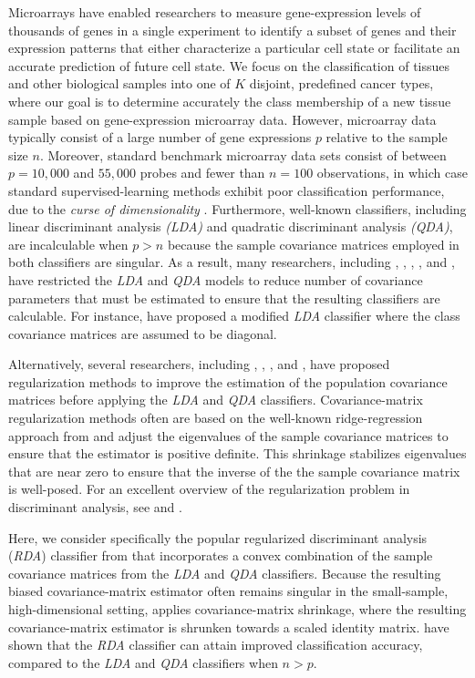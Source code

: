 \documentclass[11pt]{article}
\begin{document}
Microarrays have enabled researchers to measure gene-expression levels of thousands of genes in a single experiment to identify a subset of genes and their expression patterns that either characterize a particular cell state or facilitate an accurate prediction of future cell state.  We focus on the classification of tissues and other biological samples into one of $K$ disjoint, predefined cancer types, where our goal is to determine accurately the class membership of a new tissue sample based on gene-expression microarray data. However, microarray data typically consist of a large number of gene expressions $p$ relative to the sample size $n$. Moreover, standard benchmark microarray data sets consist of between $p = 10,000$ and $55,000$ probes and fewer than $n = 100$ observations, in which case standard supervised-learning methods exhibit poor classification performance, due to the \emph{curse of dimensionality} \citep{Bellman:1961tn}. Furthermore, well-known classifiers, including linear discriminant analysis \emph{(LDA)} and quadratic discriminant analysis \emph{(QDA)}, are incalculable when $p > n$ because the sample covariance matrices employed in both classifiers are singular. As a result, many researchers, including \cite*{Merchante:2012vk}, \cite{Witten:2011kc}, \cite*{Pang:2009ik}, \cite*{Huang:2010ju}, and \cite*{Clemmensen:2011kr}, have restricted the \emph{LDA} and \emph{QDA} models to reduce number of covariance parameters that must be estimated to ensure that the resulting classifiers are calculable.  For instance, \cite{Dudoit:2002ev} have proposed a modified \emph{LDA} classifier where the class covariance matrices are assumed to be diagonal.

Alternatively, several researchers, including \cite*{Zhang:2010va}, \cite*{Guo:2007te}, \cite{Srivastava:2007ud}, and \cite{Mkhadri:1995jp}, have proposed regularization methods to improve the estimation of the population covariance matrices before applying the \emph{LDA} and \emph{QDA} classifiers. Covariance-matrix regularization methods often are based on the well-known ridge-regression approach from \cite{Hoerl:1970cd} and adjust the eigenvalues of the sample covariance matrices to ensure that the estimator is positive definite. This shrinkage stabilizes eigenvalues that are near zero to ensure that the inverse of the the sample covariance matrix is well-posed. For an excellent overview of the regularization problem in discriminant analysis, see \cite{Murphy:2012uq} and \cite{Mkhadri:1997gy}.

Here, we consider specifically the  popular regularized discriminant analysis (\emph{RDA}) classifier from \cite{Friedman:1989tm} that incorporates a convex combination of the sample covariance matrices from the \emph{LDA} and \emph{QDA} classifiers. Because the resulting biased covariance-matrix estimator often remains singular in the small-sample, high-dimensional setting, \cite{Friedman:1989tm} applies covariance-matrix shrinkage, where the resulting covariance-matrix estimator is shrunken towards a scaled identity matrix. \cite{Friedman:1989tm} have shown that the \emph{RDA} classifier can attain improved classification accuracy, compared to the \emph{LDA} and \emph{QDA} classifiers when $n > p$.
\end{document}
